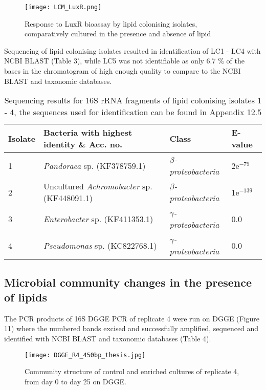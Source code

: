 \documentclass{article}
\begin{document}
\begin{figure}
\texttt{[image: LCM\_LuxR.png]}
\caption{Response to LuxR bioassay by lipid colonising isolates, comparatively cultured in the presence and absence of lipid }
\end{figure}

Sequencing of lipid colonising isolates resulted in identification of LC1 - LC4 with NCBI BLAST (Table 3), while LC5 was not identifiable as only 6.7 \% of the bases in the chromatogram of high enough quality to compare to the NCBI BLAST and taxonomic databases.
	
\begin{table}
\begin{tabular}{ | l | p{7.8cm} | p{3cm} | l | }
\hline
Isolate & Bacteria with highest identity \& Acc. no. & Class & E-value \\
\hline
1 &  \emph{Pandoraea} sp. (KF378759.1) & \emph{$\beta$-proteobacteria} & 2e$^{-79}$ \\
\hline
2 & Uncultured \emph{Achromobacter} sp. (KF448091.1) & \emph{$\beta$-proteobacteria} & 1e$^{-139}$ \\
\hline
3 & \emph{Enterobacter} sp. (KF411353.1) & \emph{$\gamma$-proteobacteria} & 0.0 \\
\hline
4 & \emph{Pseudomonas} sp. (KC822768.1) & \emph{$\gamma$-proteobacteria} & 0.0 \\
\hline
\end{tabular}
\caption{Sequencing results for 16S rRNA fragments of lipid colonising isolates 1 - 4, the sequences used for identification can be found in Appendix 12.5}
\end{table}

\subsection{Microbial community changes in the presence of lipids}
The PCR products of 16S DGGE PCR  of replicate 4 were run on DGGE (Figure 11) where the numbered bands excised and successfully amplified, sequenced and identified with NCBI BLAST and taxonomic databases (Table 4). 

\begin{figure}
\texttt{[image: DGGE\_R4\_450bp\_thesis.jpg]}
\caption{Community structure of control and enriched cultures of replicate 4, from day 0 to day 25 on DGGE.}
\end{figure}
\end{document}
